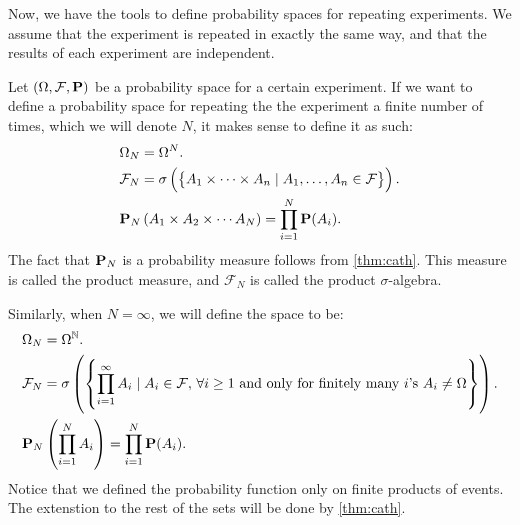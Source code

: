 \documentclass[11pt,a4paper]{article}
\begin{document}
  Now, we have the tools to define probability spaces for repeating experiments.
  We assume that the experiment is repeated in exactly the same way, and that
  the results of each experiment are independent.

  Let $(\Omega, \mathcal F, \mathbf{P})$ be a probability space for a certain
  experiment. If we want to define a probability space for repeating the
  the experiment a finite number of times, which we will denote $N$, it makes
  sense to define it as such:
  \begin{align*}
    &\Omega_N = \Omega^N. \\
    &\mathcal F_N =
    \sigma\del{\set{A_1 \times \cdots \times A_n \mid 
    A_1,\dots,A_n \in \mathcal F}}. \\
    &\Prob_N\left(A_1 \times A_2 \times \cdots A_N\right) = 
    \prod_{i=1}^{N} \Prob(A_i).
  \end{align*}
  The fact that $\mathbf{P}_N$ is a probability measure follows from 
  \autoref{thm:cath}. This measure is called the product measure, and 
  $\mathcal F_N$ is called the product $\sigma$-algebra.

  Similarly, when $N=\infty$, we will define the space to be:
  \begin{align*}
    &\Omega_N = \Omega^{\mathbb{N}}. \\
    &\mathcal F_N = \sigma\left(\set{\prod_{i=1}^{\infty}{A_i} \mid
    A_i \in \mathcal F, \, \forall i \geq 1 \text{ and only for finitely many
    $i$'s } A_i \neq \Omega}\right). \\
    &\mathbf{P}_N\left(\prod_{i=1}^{N}{A_i}\right) = 
    \prod_{i=1}^{N} \mathbf{P}(A_i).
  \end{align*}
  Notice that we defined the probability function only on finite products of
  events. The extenstion to the rest of the sets will be done by 
  \autoref{thm:cath}.
\end{document}
